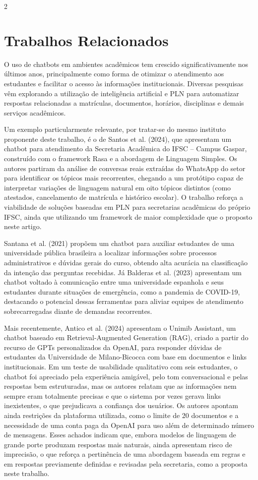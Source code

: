 \documentclass[10pt]{article}
\begin{document}
\begin{multicols}{2}
\section{Trabalhos Relacionados}\label{sec:trabalhos}

O uso de chatbots em ambientes acadêmicos tem crescido significativamente
nos últimos anos, principalmente como forma de otimizar o atendimento aos
estudantes e facilitar o acesso às informações institucionais. Diversas
pesquisas vêm explorando a utilização de inteligência artificial e PLN
para automatizar respostas relacionadas a matrículas, documentos,
horários, disciplinas e demais serviços acadêmicos.

Um exemplo particularmente relevante, por tratar-se do mesmo instituto
proponente deste trabalho, é o de Santos et al. (2024), que apresentam um
chatbot para atendimento da Secretaria Acadêmica do IFSC -- Campus
Gaspar, construído com o framework Rasa e a abordagem de Linguagem
Simples. Os autores partiram da análise de conversas reais extraídas do
WhatsApp do setor para identificar os tópicos mais recorrentes, chegando
a um protótipo capaz de interpretar variações de linguagem natural em
oito tópicos distintos (como atestados, cancelamento de matrícula e
histórico escolar). O trabalho reforça a viabilidade de soluções baseadas
em PLN para secretarias acadêmicas do próprio IFSC, ainda que utilizando
um framework de maior complexidade que o proposto neste artigo.

Santana et al. (2021) propõem um chatbot para auxiliar estudantes de uma
universidade pública brasileira a localizar informações sobre processos
administrativos e dúvidas gerais do curso, obtendo alta acurácia na
classificação da intenção das perguntas recebidas. Já Balderas et al.
(2023) apresentam um chatbot voltado à comunicação entre uma
universidade espanhola e seus estudantes durante situações de
emergência, como a pandemia de COVID-19, destacando o potencial dessas
ferramentas para aliviar equipes de atendimento sobrecarregadas diante de
demandas recorrentes.

Mais recentemente, Antico et al. (2024) apresentam o Unimib Assistant,
um chatbot baseado em Retrieval-Augmented Generation (RAG), criado a
partir do recurso de GPTs personalizados da OpenAI, para responder
dúvidas de estudantes da Universidade de Milano-Bicocca com base em
documentos e links institucionais. Em um teste de usabilidade qualitativo
com seis estudantes, o chatbot foi apreciado pela experiência amigável,
pelo tom conversacional e pelas respostas bem estruturadas, mas os
autores relatam que as informações nem sempre eram totalmente precisas e
que o sistema por vezes gerava links inexistentes, o que prejudicava a
confiança dos usuários. Os autores apontam ainda restrições da plataforma
utilizada, como o limite de 20 documentos e a necessidade de uma conta
paga da OpenAI para uso além de determinado número de mensagens. Esses
achados indicam que, embora modelos de linguagem de grande porte
produzam respostas mais naturais, ainda apresentam risco de imprecisão,
o que reforça a pertinência de uma abordagem baseada em regras e em
respostas previamente definidas e revisadas pela secretaria, como a
proposta neste trabalho.


\end{multicols}
\end{document}
